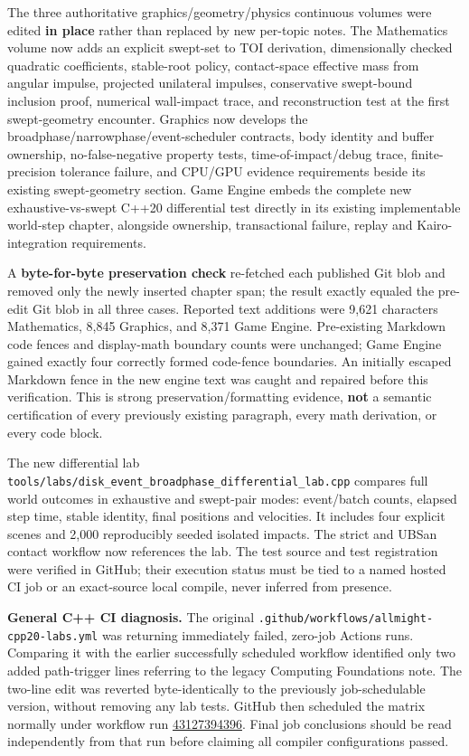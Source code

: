 The three authoritative graphics/geometry/physics continuous volumes were edited \textbf{in place} rather than replaced by new per-topic notes. The Mathematics volume now adds an explicit swept-set to TOI derivation, dimensionally checked quadratic coefficients, stable-root policy, contact-space effective mass from angular impulse, projected unilateral impulses, conservative swept-bound inclusion proof, numerical wall-impact trace, and reconstruction test at the first swept-geometry encounter. Graphics now develops the broadphase/narrowphase/event-scheduler contracts, body identity and buffer ownership, no-false-negative property tests, time-of-impact/debug trace, finite-precision tolerance failure, and CPU/GPU evidence requirements beside its existing swept-geometry section. Game Engine embeds the complete new exhaustive-vs-swept C++20 differential test directly in its existing implementable world-step chapter, alongside ownership, transactional failure, replay and Kairo-integration requirements.

A \textbf{byte-for-byte preservation check} re-fetched each published Git blob and removed only the newly inserted chapter span; the result exactly equaled the pre-edit Git blob in all three cases. Reported text additions were 9,621 characters Mathematics, 8,845 Graphics, and 8,371 Game Engine. Pre-existing Markdown code fences and display-math boundary counts were unchanged; Game Engine gained exactly four correctly formed code-fence boundaries. An initially escaped Markdown fence in the new engine text was caught and repaired before this verification. This is strong preservation/formatting evidence, \textbf{not} a semantic certification of every previously existing paragraph, every math derivation, or every code block.

The new differential lab \texttt{tools/labs/disk\_event\_broadphase\_differential\_lab.cpp} compares full world outcomes in exhaustive and swept-pair modes: event/batch counts, elapsed step time, stable identity, final positions and velocities. It includes four explicit scenes and 2,000 reproducibly seeded isolated impacts. The strict and UBSan contact workflow now references the lab. The test source and test registration were verified in GitHub; their execution status must be tied to a named hosted CI job or an exact-source local compile, never inferred from presence.

\textbf{General C++ CI diagnosis.} The original \texttt{.github/workflows/allmight-cpp20-labs.yml} was returning immediately failed, zero-job Actions runs. Comparing it with the earlier successfully scheduled workflow identified only two added path-trigger lines referring to the legacy Computing Foundations note. The two-line edit was reverted byte-identically to the previously job-schedulable version, without removing any lab tests. GitHub then scheduled the matrix normally under workflow run \href{https://github.com/swayam8624/Project_008_AllMight/actions/runs/43127394396}{43127394396}. Final job conclusions should be read independently from that run before claiming all compiler configurations passed.

